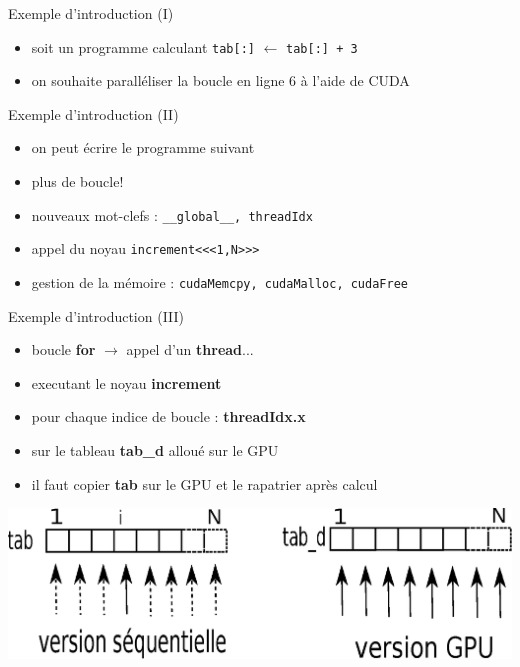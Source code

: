 \documentclass[11pt,mathserif]{beamer}
\begin{document}
\begin{frame}{Exemple d'introduction (I)}
\pause
\begin{itemize}[<+->]
 \item soit un programme calculant \texttt{tab[:]} $\leftarrow$ \texttt{tab[:] + 3}

\item on souhaite paralléliser la boucle en ligne 6 à l'aide de CUDA
\end{itemize}
\end{frame}
\begin{frame}{Exemple d'introduction (II) }
\pause
\begin{itemize}[<+->]
 \item on peut écrire le programme suivant

\item plus de boucle!
\item nouveaux mot-clefs : \texttt{\_\_global\_\_, threadIdx}
\item appel du noyau \texttt{increment<<<1,N>>>}
\item gestion de la mémoire : \texttt{cudaMemcpy, cudaMalloc, cudaFree}
\end{itemize}
\end{frame}
\begin{frame}{Exemple d'introduction (III)}
\pause
\begin{itemize}[<+->]
  \item boucle \textbf{for} $\rightarrow$ appel d'un {\bf thread}...
 \item executant le noyau \textbf{increment}
 \item pour chaque indice de boucle : \textbf{threadIdx.x }
 \item sur le tableau \textbf{tab\_d} alloué sur le GPU
 \item il faut copier \textbf{tab} sur le GPU et le rapatrier après calcul
\end{itemize}
\pause
\begin{center}
\includegraphics[width=0.9\linewidth]{fig/parallel.eps}
\end{center}
\end{frame}
\end{document}
